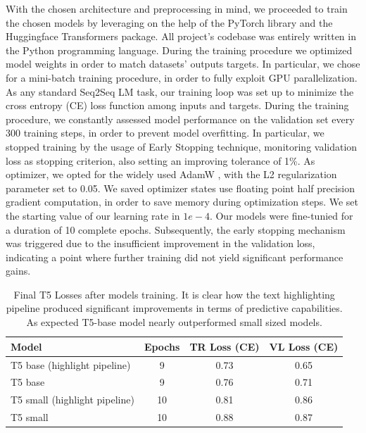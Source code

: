 \documentclass{article}
\begin{document}
With the chosen architecture and preprocessing in mind, we proceeded to train the chosen models by leveraging on the help of the PyTorch library and the Huggingface Transformers package. All project's codebase was entirely written in the Python programming language. During the training procedure we optimized model weights in order to match datasets' outputs targets. In particular, we chose for a mini-batch training procedure, in order to fully exploit GPU parallelization. As any standard Seq2Seq LM task, our training loop was set up to minimize the cross entropy (CE) loss function among inputs and targets. During the training procedure, we constantly assessed model performance on the validation set every 300 training steps, in order to prevent model overfitting. In particular, we stopped training by the usage of Early Stopping technique, monitoring validation loss as stopping criterion, also setting an improving tolerance of 1\%. As optimizer, we opted for the widely used AdamW \cite{adamw}, with the L2 regularization parameter set to 0.05. We saved optimizer states use floating point half precision gradient computation, in order to save memory during optimization steps. We set the starting value of our learning rate in $1e-4$. Our models were fine-tunied for a duration of 10 complete epochs. Subsequently, the early stopping mechanism was triggered due to the insufficient improvement in the validation loss, indicating a point where further training did not yield significant performance gains.
\begin{table}[h]
\centering
    \begin{tabular}{lccc}
    \toprule
    \midrule
    Model & Epochs & TR Loss (CE) & VL Loss (CE) \\
    \midrule
    T5 base (highlight pipeline)  & 9    & 0.73 & 0.65 \\
    T5 base                       & 9    & 0.76 & 0.71 \\
    T5 small (highlight pipeline) & 10   & 0.81 & 0.86 \\
    T5 small                      & 10   & 0.88 & 0.87 \\
    \bottomrule
        
    \end{tabular}
    
    \caption{Final T5 Losses after models training. It is clear how the text highlighting pipeline produced significant improvements in terms of predictive capabilities. As expected T5-base model nearly outperformed small sized models.}
    \label{table:losses}
\end{table}
\end{document}
